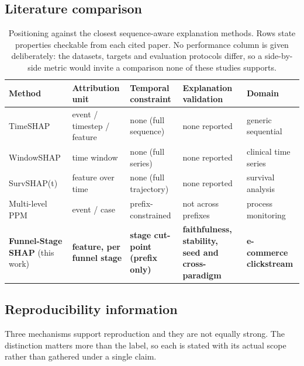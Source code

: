 \documentclass[a4paper]{article}
\begin{document}
\subsection{Literature comparison}

\begin{table}[htbp]
\centering
\caption{Positioning against the closest sequence-aware explanation methods.
Rows state properties checkable from each cited paper. No performance column
is given deliberately: the datasets, targets and evaluation protocols differ,
so a side-by-side metric would invite a comparison none of these studies
supports.}
\label{tab:a-literature}
\small
\begin{tabular}{@{}p{3.2cm}p{2.6cm}p{2.8cm}p{3.4cm}p{2.2cm}@{}}
\toprule
\textbf{Method} & \textbf{Attribution unit} & \textbf{Temporal constraint} &
\textbf{Explanation validation} & \textbf{Domain} \\
\midrule
TimeSHAP \citep{bento2021timeshap} & event / timestep / feature & none (full sequence) & none reported & generic sequential \\
WindowSHAP \citep{nayebi2023windowshap} & time window & none (full series) & none reported & clinical time series \\
SurvSHAP(t) \citep{krzyzinski2022survshap} & feature over time & none (full trajectory) & none reported & survival analysis \\
Multi-level PPM \citep{wickramanayake2023generating} & event / case & prefix-constrained & not across prefixes & process monitoring \\
\textbf{Funnel-Stage SHAP} (this work) & \textbf{feature, per funnel stage} & \textbf{stage cut-point (prefix only)} & \textbf{faithfulness, stability, seed and cross-paradigm} & \textbf{e-commerce clickstream} \\
\bottomrule
\end{tabular}
\end{table}

\subsection*{Reproducibility information}
\label{app:reproducibility}

Three mechanisms support reproduction and they are not equally strong. The
distinction matters more than the label, so each is stated with its actual
scope rather than gathered under a single claim.
\end{document}
